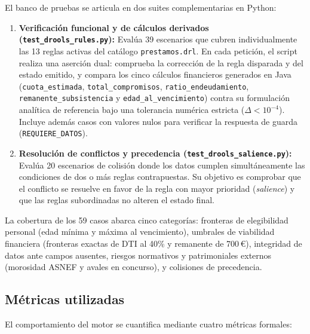 \documentclass[12pt,a4paper]{report}
\begin{document}
El banco de pruebas se articula en dos suites complementarias en Python:
\begin{enumerate}
    \item \textbf{Verificación funcional y de cálculos derivados (\texttt{test\_drools\_rules.py}):} Evalúa 39 escenarios que cubren individualmente las 13 reglas activas del catálogo \texttt{prestamos.drl}. En cada petición, el script realiza una aserción dual: comprueba la corrección de la regla disparada y del estado emitido, y compara los cinco cálculos financieros generados en Java (\texttt{cuota\_estimada}, \texttt{total\_compromisos}, \texttt{ratio\_endeudamiento}, \texttt{remanente\_subsistencia} y \texttt{edad\_al\_vencimiento}) contra su formulación analítica de referencia bajo una tolerancia numérica estricta ($\Delta < 10^{-4}$). Incluye además casos con valores nulos para verificar la respuesta de guarda (\texttt{REQUIERE\_DATOS}).
    \item \textbf{Resolución de conflictos y precedencia (\texttt{test\_drools\_salience.py}):} Evalúa 20 escenarios de colisión donde los datos cumplen simultáneamente las condiciones de dos o más reglas contrapuestas. Su objetivo es comprobar que el conflicto se resuelve en favor de la regla con mayor prioridad (\textit{salience}) y que las reglas subordinadas no alteren el estado final.
\end{enumerate}

La cobertura de los 59 casos abarca cinco categorías: fronteras de elegibilidad personal (edad mínima y máxima al vencimiento), umbrales de viabilidad financiera (fronteras exactas de DTI al 40\% y remanente de 700\,€), integridad de datos ante campos ausentes, riesgos normativos y patrimoniales externos (morosidad ASNEF y avales en concurso), y colisiones de precedencia.

\subsection{Métricas utilizadas}

El comportamiento del motor se cuantifica mediante cuatro métricas formales:
\end{document}
